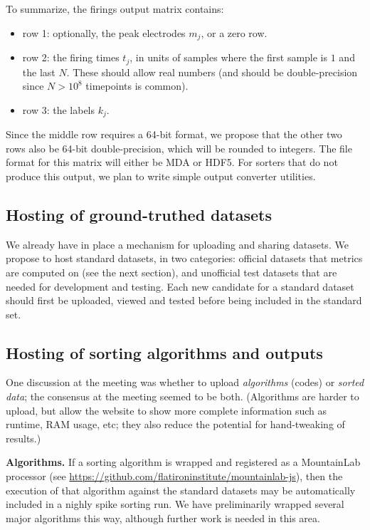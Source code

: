\documentclass[10pt]{article}
\newcommand{\bi}{\begin{itemize}}
\newcommand{\ei}{\end{itemize}}
\begin{document}
To summarize, the firings output matrix contains:
\bi
\item row 1: optionally, the peak electrodes $m_j$, or a zero row.
\item row 2: the firing times $t_j$, in units of samples where
the first sample is $1$ and the last $N$. These should allow real numbers
(and should be double-precision since $N>10^8$ timepoints is common).
\item row 3: the labels $k_j$.
\ei
  
Since the middle row requires a 64-bit format, we propose that the
other two rows also be 64-bit double-precision, which will be rounded
to integers.
The file format for this matrix will either be MDA or HDF5.
For sorters that do not produce this output, we plan to
write simple output converter utilities.

\subsection{Hosting of ground-truthed datasets}

We already have in place a mechanism for uploading and sharing datasets.
We propose to host standard datasets, in two categories:
official datasets that metrics are computed on
(see the next section),
and unofficial test datasets that are needed for development and testing.
Each new candidate for a standard dataset should first be uploaded, viewed and tested before being included in the standard set.

\subsection{Hosting of sorting algorithms and outputs}

One discussion at the meeting was 
whether to upload {\em algorithms} (codes) or {\em sorted data};
the consensus at the meeting seemed to be both.
(Algorithms are harder to upload, but allow the website to show more complete
information such as runtime, RAM usage, etc; they also reduce the potential
for hand-tweaking of results.)

{\bf Algorithms.}
If a sorting algorithm is wrapped and registered as a MountainLab processor (see \url{https://github.com/flatironinstitute/mountainlab-js}), then the execution of that algorithm against the standard datasets may be automatically included in a nighly spike sorting run.
We have preliminarily wrapped several major algorithms this way, although further work is needed in this area.
\end{document}
